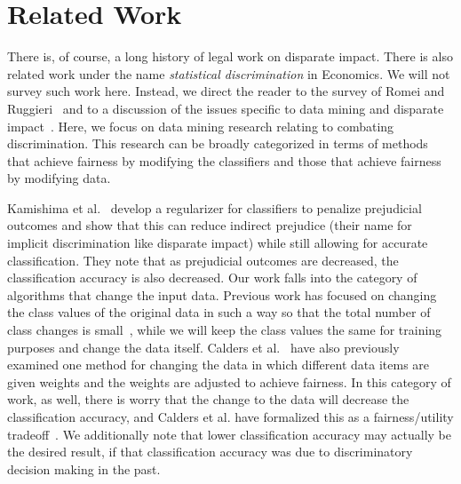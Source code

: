 \section{Related Work}
There is, of course, a long history of legal work on disparate impact.  There is also related work under the name \emph{statistical discrimination} in Economics.  We will not survey such work here.  Instead, we direct the reader to the survey of Romei and Ruggieri~\cite{Romei13Multidisciplinary} and to a discussion of the issues specific to data mining and disparate impact~\cite{Barocas14DisparateImpact}.  Here, we focus on data mining research relating to  combating discrimination.  This research can be broadly categorized in terms of methods that achieve fairness by modifying the classifiers and those that achieve fairness by modifying data. 

 Kamishima et al.~\cite{Kamishima12Fairness, Kamishima11Fairness} develop a regularizer for classifiers to penalize prejudicial outcomes and show that this can reduce indirect prejudice (their name for implicit discrimination like disparate impact) while still allowing for accurate classification.  They note that as prejudicial outcomes are decreased, the classification accuracy is also decreased.
Our work falls into the category of algorithms that change the input data.  Previous work has focused on changing the class values of the original data in such a way so that the total number of class changes is small~\cite{Kamiran09Classifying, Calders09Building}, while we will keep the class values the same for training purposes and change the data itself.  Calders et al.~\cite{Calders09Building} have also previously examined one method for changing the data in which different data items are given weights and the weights are adjusted to achieve fairness.  In this category of work, as well, there is worry that the change to the data will decrease the classification accuracy, and Calders et al. have formalized this as a fairness/utility tradeoff~\cite{Calders09Building}.  We additionally note that lower classification accuracy may actually be the desired result, if that classification accuracy was due to discriminatory decision making in the past.

